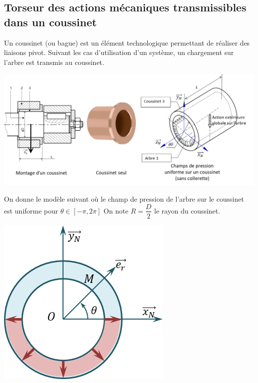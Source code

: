\documentclass[10pt,fleqn]{article} %
\begin{document}

\vspace{4.5cm}
\pagestyle{fancy}
\thispagestyle{plain}


\def\columnseprulecolor{\color{ocre}}
\setlength{\columnseprule}{0.4pt} 

\ifprof
\begin{multicols}{2}
\else
\begin{multicols}{2}
\fi

\section*{Torseur des actions mécaniques transmissibles dans un coussinet}


\ifprof
\else
Un coussinet (ou bague) est un élément technologique permettant de réaliser des liaisons pivot. Suivant les cas d'utilisation d'un système, un chargement sur l'arbre est transmis au coussinet. 

\begin{center}
\includegraphics[width=\linewidth]{images/fig_01}
\end{center}


On donne le modèle suivant où le champ de pression de l'arbre sur le coussinet est uniforme pour $\theta\in[-\pi,2\pi]$ 
On note $R=\dfrac{D}{2}$ le rayon du coussinet. 

\begin{center}
\includegraphics[width=.4\linewidth]{images/fig_02}
\end{center}
\fi


\end{multicols}
\end{multicols}
\end{document}
